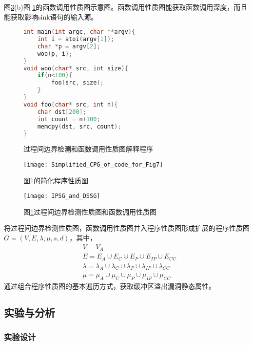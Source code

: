 {图\ref{过程间边界检测性质图和函数调用性质图}(b)图 \ref{过程间边界检测和函数调用性质图解释程序}的函数调用性质图示意图。函数调用性质图能获取函数调用深度，而且能获取影响sink语句的输入源。

\begin{figure}[h]
\begin{lstlisting}[language=C]
int main(int argc, char **argv){
    int i = atoi(argv[1]);
    char *p = argv[2];
    woo(p, i);
}
void woo(char* src, int size){
    if(n<100){
        foo(src, size);
    }
}
void foo(char* src, int n){
    char dst[200];
    int count = n+100;
    memcpy(dst, src, count);
}
\end{lstlisting}

\caption{过程间边界检测和函数调用性质图解释程序}
\label{过程间边界检测和函数调用性质图解释程序}
\end{figure}

\begin{figure}[htp]
\centering
\texttt{[image: Simplified\_CPG\_of\_code\_for\_Fig7]}
\caption{图\ref{过程间边界检测和函数调用性质图解释程序}的简化程序性质图}
\label{简化程序性质图}
\end{figure}

\begin{figure}[htp]
\centering
\texttt{[image: IPSG\_and\_DSSG]}
\caption{图\ref{过程间边界检测和函数调用性质图解释程序}过程间边界检测性质图和函数调用性质图}
\label{过程间边界检测性质图和函数调用性质图}
\end{figure}

将过程间边界检测性质图，函数调用性质图并入程序性质图形成扩展的程序性质图$G=(V,E,\lambda, \mu, s, d)$，其中，
\begin{align*}
& V = V_{A} \\
& E = E_{A} \cup E_{C} \cup E_{P} \cup E_{IP} \cup E_{CC}\\
& \lambda = \lambda_{A} \cup \lambda_{C} \cup \lambda_{P} \cup \lambda_{IP} \cup \lambda_{CC} \\
& \mu = \mu_{A} \cup \mu_{C} \cup \mu_{P} \cup \mu_{IP} \cup \mu_{CC}
\end{align*}
通过组合程序性质图的基本遍历方式，获取缓冲区溢出漏洞静态属性。

\subsection{实验与分析}

\subsubsection{实验设计}

}
